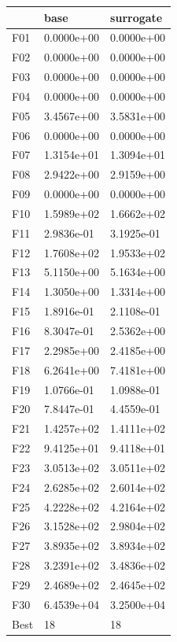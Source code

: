 \begin{tabular}{lll}
\toprule
{} &        base &   surrogate \\
\midrule
F01  &  0.0000e+00 &  0.0000e+00 \\
F02  &  0.0000e+00 &  0.0000e+00 \\
F03  &  0.0000e+00 &  0.0000e+00 \\
F04  &  0.0000e+00 &  0.0000e+00 \\
F05  &  3.4567e+00 &  3.5831e+00 \\
F06  &  0.0000e+00 &  0.0000e+00 \\
F07  &  1.3154e+01 &  1.3094e+01 \\
F08  &  2.9422e+00 &  2.9159e+00 \\
F09  &  0.0000e+00 &  0.0000e+00 \\
F10  &  1.5989e+02 &  1.6662e+02 \\
F11  &  2.9836e-01 &  3.1925e-01 \\
F12  &  1.7608e+02 &  1.9533e+02 \\
F13  &  5.1150e+00 &  5.1634e+00 \\
F14  &  1.3050e+00 &  1.3314e+00 \\
F15  &  1.8916e-01 &  2.1108e-01 \\
F16  &  8.3047e-01 &  2.5362e+00 \\
F17  &  2.2985e+00 &  2.4185e+00 \\
F18  &  6.2641e+00 &  7.4181e+00 \\
F19  &  1.0766e-01 &  1.0988e-01 \\
F20  &  7.8447e-01 &  4.4559e-01 \\
F21  &  1.4257e+02 &  1.4111e+02 \\
F22  &  9.4125e+01 &  9.4118e+01 \\
F23  &  3.0513e+02 &  3.0511e+02 \\
F24  &  2.6285e+02 &  2.6014e+02 \\
F25  &  4.2228e+02 &  4.2164e+02 \\
F26  &  3.1528e+02 &  2.9804e+02 \\
F27  &  3.8935e+02 &  3.8934e+02 \\
F28  &  3.2391e+02 &  3.4836e+02 \\
F29  &  2.4689e+02 &  2.4645e+02 \\
F30  &  6.4539e+04 &  3.2500e+04 \\
Best &          18 &          18 \\
\bottomrule
\end{tabular}
